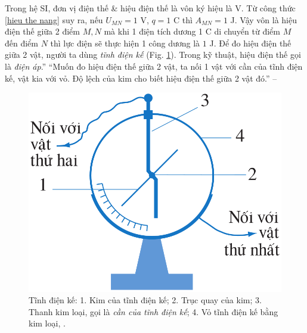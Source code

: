 \documentclass[oneside]{book}
\numberwithin{equation}{section}
\begin{document}
Trong hệ SI, đơn vị điện thế \& hiệu điện thế là vôn ký hiệu là V. Từ công thức \eqref{hieu the nang} suy ra, nếu $U_{MN} = 1$ V, $q = 1$ C thì $A_{MN} = 1$ J. Vậy vôn là hiệu điện thế giữa 2 điểm $M,N$ mà khi 1 điện tích dương 1 C di chuyển từ điểm $M$ đến điểm $N$ thì lực điện sẽ thực hiện 1 công dương là $1$ J. Để đo hiệu điện thế giữa 2 vật, người ta dùng \textit{tĩnh điện kế} (Fig. \ref{fig:tinh dien ke}). Trong kỹ thuật, hiệu điện thế gọi là \textit{điện áp}.'' ``Muốn đo hiệu điện thế giữa 2 vật, ta nối 1 vật với cần của tĩnh điện kế, vật kia với vỏ. Độ lệch của kim cho biết hiệu điện thế giữa 2 vật đó.'' -- \cite[p. 21]{SGK_Vat_Ly_11_nang_cao}

\begin{figure}[H]
	\centering
	\includegraphics[scale=0.15]{tinh_dien_ke}
	\caption{Tĩnh điện kế: 1. Kim của tĩnh điện kế; 2. Trục quay của kim; 3. Thanh kim loại, gọi là \textit{cần của tĩnh điện kế}; 4. Vỏ tĩnh điện kế bằng kim loại, \cite[Hình 4.2, p. 21]{SGK_Vat_Ly_11_nang_cao}.}
	\label{fig:tinh dien ke}
\end{figure}
\end{document}
